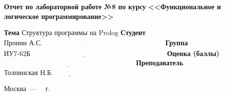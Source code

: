 \documentclass[12pt]{report}
\begin{document}
\begin{titlepage}
		\begin{center}
			\noindent\begin{minipage}{1.1\textwidth}\centering
				\Large\textbf{Отчет по лабораторной работе №8 по курсу}\newline
				\textbf{<<Функциональное и логическое программирование>>}\newline
				\newline\newline
			\end{minipage}
		\end{center}
		
		\noindent\textbf{Тема} $\underline{\text{Структура программы на Prolog}}$\newline\newline
		\noindent\textbf{Студент} $\underline{\text{Пронин А.С.~~~~~~~~~~~~~~~~~~~~~~~~~~~~~~~~~~~~~~~~~~~~~~~~~~~~~}}$\newline\newline
		\noindent\textbf{Группа} $\underline{\text{ИУ7-62Б~~~~~~~~~~~~~~~~~~~~~~~~~~~~~~~~~~~~~~~~~~~~~~~~~~~~~~~~~~~}}$\newline\newline
		\noindent\textbf{Оценка (баллы)} $\underline{\text{~~~~~~~~~~~~~~~~~~~~~~~~~~~~~~~~~~~~~~~~~~~~~~~~~~~~~~~~~}}$\newline\newline
		\noindent\textbf{Преподаватель} $\underline{\text{Толпинская Н.Б.~~~~~~~~~~~~~~~~~~~~~~~~~~~~~~~~~~~~}}$\newline\newline\newline
		
		\begin{center}
			\vfill
			Москва~---~\the\year
			~г.
		\end{center}
	\end{titlepage}
	
	
	
	
\end{document}

